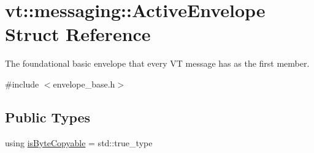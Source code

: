 \hypertarget{structvt_1_1messaging_1_1_active_envelope}{}\section{vt\+:\+:messaging\+:\+:Active\+Envelope Struct Reference}
\label{structvt_1_1messaging_1_1_active_envelope}


The foundational basic envelope that every VT message has as the first member.  




{\ttfamily \#include $<$envelope\+\_\+base.\+h$>$}

\subsection*{Public Types}
\begin{DoxyCompactItemize}
\item 
using \hyperlink{structvt_1_1messaging_1_1_active_envelope_ad9d4a03838736cf7240bd25bc317fd3c}{is\+Byte\+Copyable} = std\+::true\+\_\+type
\end{DoxyCompactItemize}
